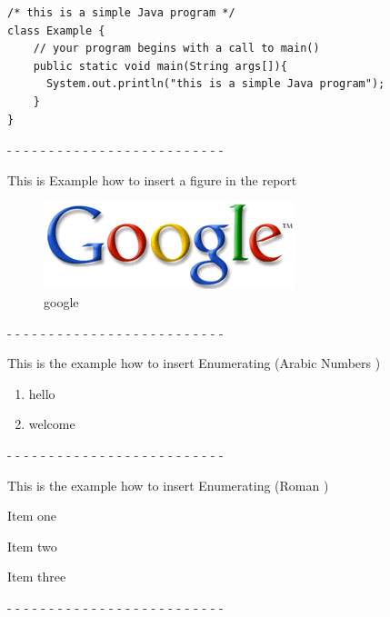 \documentclass{report}
\newcounter{mycounter}
\begin{document}
\lstset{language=Java , numbers=left , caption=The Program Written in Latex  ,captionpos=b, frame=single}
\begin{lstlisting}
/* this is a simple Java program */
class Example {
    // your program begins with a call to main()
    public static void main(String args[]){
      System.out.println("this is a simple Java program");
    }
}
\end{lstlisting}

- - - - - - - - - - - - - - - - - - - - - - - - - -

This is Example how to insert a figure in the report
\begin{figure}[h]
\centering
\includegraphics[scale=1 ]{google.png}
\caption{google}
\label{labelname}
\end{figure}

\newpage

- - - - - - - - - - - - - - - - - - - - - - - - - -

This is the example how to insert Enumerating (Arabic Numbers )
\begin{enumerate}
\item hello
\item welcome
\end{enumerate} 

- - - - - - - - - - - - - - - - - - - - - - - - - -


This is the example how to insert Enumerating (Roman )
\begin{list}{Topic :~}{}
\item Item one
\item Item two
\item Item three
\end{list}

- - - - - - - - - - - - - - - - - - - - - - - - - -
\end{document}
